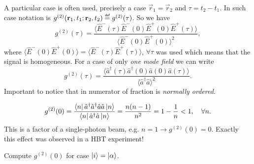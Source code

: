 A particular case is often used, precisely a case $\vec{r}_1 = \vec{r}_2$ and $\tau = t_2 - t_1$. In such case notation is $g^{(2)} (\vec{r}_1, t_1; \vec{r}_2, t_2) \myeq g^{(2)} (\tau)$. So we have
\begin{equation}
	g^{(2)} (\tau) = \frac{\langle \hat{E}^-(\tau) \hat{E}^-(0) \hat{E}^+(0) \hat{E}^+(\tau)\rangle}{\langle \hat{E}^-(0) \hat{E}^+(0) \rangle^2},
\end{equation}
where $\langle \hat{E}^-(0) \hat{E}^+(0) \rangle = \langle \hat{E}^-(\tau) \hat{E}^+(\tau) \rangle$, $\forall \tau$ was used which means that the signal is homogeneous. For a case of only \textit{one mode field} we can write
\begin{equation}
	g^{(2)} (\tau) = \frac{\langle \hat{a}^{\dagger} (\tau) \hat{a}^{\dagger} (0) \hat{a}(0) \hat{a}(\tau) \rangle}{\langle \hat{a}^{\dagger} \hat{a} \rangle^2}.
\end{equation}
Important to notice that in numerator of fraction is \textit{normally ordered}.

\begin{testexample}[The second-order correlation function for Fock states ($\ket{i} = \ket{n}$).]
	\begin{equation}
		g^{(2)} (0) = \frac{\left\langle {n} \right\rvert \hat{a}^{\dagger} \hat{a}^{\dagger} \hat{a} \hat{a} \left\lvert {n} \right\rangle}{\left\langle {n} \right\rvert\hat{a}^{\dagger} \hat{a} \left\lvert {n} \right\rangle} = \frac{n(n-1)}{n^2} = 1 - \frac{1}{n} < 1, \quad \forall n.
	\end{equation}
	This is a factor of a single-photon beam, e.g. $n=1 \to g^{(2)}(0)=0$. Exactly this effect was observed in a HBT experiment!
\end{testexample}

\begin{hw}
	Compute $g^{(2)}(0)$ for case $\left\lvert {i} \right\rangle = \left\lvert {\alpha} \right\rangle$.
\end{hw}